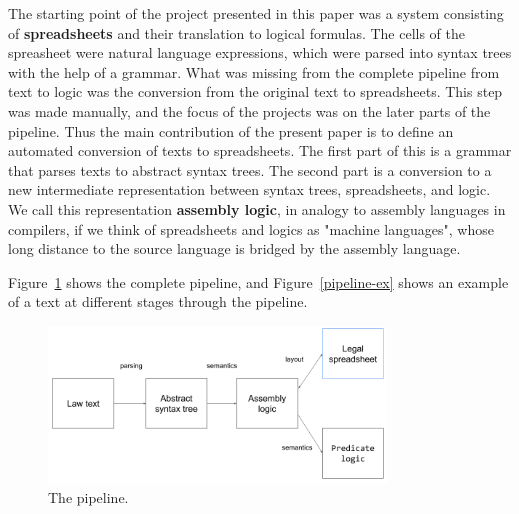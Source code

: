 \documentclass{IOS-Book-Article}
\begin{document}
The starting point of the project presented in this paper was a system consisting of \textbf{spreadsheets} and their translation to logical formulas.
The cells of the spreasheet were natural language expressions, which were parsed into syntax trees with the help of a grammar.
What was missing from the complete pipeline from text to logic was the conversion from the original text to spreadsheets.
This step was made manually, and the focus of the projects was on the later parts of the pipeline.
Thus the main contribution of the present paper is to define an automated conversion of texts to spreadsheets.
The first part of this is a grammar that parses texts to abstract syntax trees.
The second part is a conversion to a new intermediate representation between syntax trees, spreadsheets, and logic.
We call this representation \textbf{assembly logic}, in analogy to assembly languages in compilers, if we think of spreadsheets and logics as "machine languages", whose long distance to the source language is bridged by the assembly language.

Figure~\ref{pipeline} shows the complete pipeline, and Figure~\ref{pipeline-ex} shows an example of a text at different stages through the pipeline.
\begin{figure}
\includegraphics[width=0.8\textwidth]{pipeline.png}
\caption{The pipeline.}
\label{pipeline}
\end{figure}
\end{document}
